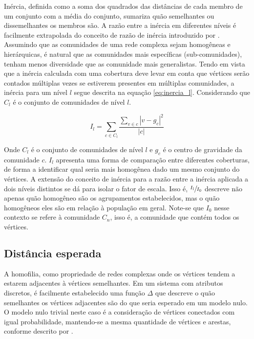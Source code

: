 \documentclass[notes.tex]{subfiles}
\begin{document}
Inércia, definida como a soma dos quadrados das distâncias de cada membro de um conjunto com a média do conjunto, sumariza quão semelhantes ou dissemelhantes os membros são.
A razão entre a inércia em diferentes níveis é facilmente extrapolada do conceito de razão de inércia introduzido por .
Assumindo que as comunidades de uma rede complexa sejam homogêneas e hierárquicas, é natural que as comunidades mais específicas (sub-comunidades), tenham menos diversidade que as comunidade mais generalistas.
Tendo em vista que a inércia calculada com uma cobertura deve levar em conta que vértices serão contados múltiplas vezes se estiverem presentes em múltiplas comunidades, a inércia para um nível $l$ segue descrita na equação \ref{eq:inercia_l}.
Considerando que $C_l$ é o conjunto de comunidades de nível  $l$.

\begin{equation}\label{eq:inercia_l}
    I_l = \sum_{c \in C_l}\frac{\sum_{v \in c} |v-g_c|^2}{|c|}
\end{equation}

Onde $C_l$ é o conjunto de comunidades de nível $l$ e $g_c$ é o centro de gravidade da comunidade  $c$.
$I_l$ apresenta uma forma de comparação entre diferentes coberturas, de forma a identificar qual seria mais homogênea dado um mesmo conjunto do vértices.
A extensão do conceito de inércia para a razão entre a inércia aplicada a dois níveis distintos se dá para isolar o fator de escala.
Isso é, $\sfrac{I_l}{I_0}$ descreve não apenas quão homogêneo são os agrupamentos estabelecidos, mas o quão homogêneos eles são em relação à população em geral.
Note-se que $I_0$ nesse contexto se refere à comunidade $C_n$, isso é, a comunidade que contém todos os vértices.

\subsection{Distância esperada}

A homofilia, como propriedade de redes complexas onde os vértices tendem a estarem adjacentes à vértices semelhantes.
Em um sistema com atributos discretos, é facilmente estabelecido uma função $\Delta$  que descreve o quão semelhantes os vértices adjacentes são do que seria esperado em um modelo nulo.
O modelo nulo trivial neste caso é a consideração de vértices conectados com igual probabilidade, mantendo-se a mesma quantidade de vértices e arestas, conforme descrito por .
\end{document}
